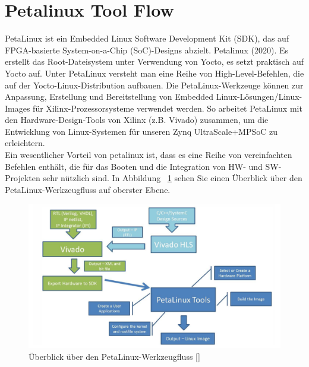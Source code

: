 \section{Petalinux Tool Flow}
\label{sec:Petalinux_Toolflow}
PetaLinux ist ein Embedded Linux Software Development Kit (SDK), das auf FPGA-basierte System-on-a-Chip (SoC)-Designs abzielt. Petalinux (2020). Es erstellt das Root-Dateisystem unter Verwendung von Yocto, es setzt praktisch auf Yocto auf. Unter PetaLinux versteht man eine Reihe von High-Level-Befehlen, die auf der Yocto-Linux-Distribution aufbauen. Die PetaLinux-Werkzeuge können zur Anpassung, Erstellung und Bereitstellung von Embedded Linux-Lösungen/Linux-Images für Xilinx-Prozessorsysteme verwendet werden. So arbeitet PetaLinux mit den Hardware-Design-Tools von Xilinx (z.B. Vivado) zusammen, um die Entwicklung von Linux-Systemen für unseren Zynq UltraScale+MPSoC zu erleichtern.\\
Ein wesentlicher Vorteil von petalinux ist, dass es eine Reihe von vereinfachten Befehlen enthält, die für das Booten und die Integration von HW- und SW-Projekten sehr nützlich sind. In Abbildung ~\ref{fig:petalinux:tool:flow} sehen Sie einen Überblick über den PetaLinux-Werkzeugfluss auf oberster Ebene.
	
\begin{figure}[h]
	\begin{center}
		\includegraphics[width=1.1\textwidth]{./images/petalinux-toolflow.jpg}
	\end{center}
	\vspace{-5pt}
	\caption[PetaLinux-Werkzeugfluss]{Überblick über den PetaLinux-Werkzeugfluss [\cite{petailinuxtool}]} %
	\label{fig:petalinux:tool:flow}
	\vspace{-5pt}
\end{figure}

